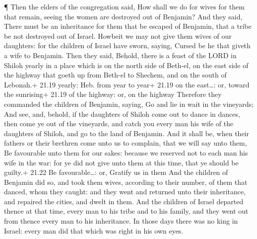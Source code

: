  ¶ Then the elders of the congregation said, How shall we
do for wives for them that remain, seeing the women are destroyed out of
Benjamin?  And they said, There must be an inheritance for
them that be escaped of Benjamin, that a tribe be not destroyed out of
Israel.  Howbeit we may not give them wives of our
daughters: for the children of Israel have sworn, saying, Cursed be he
that giveth a wife to Benjamin.  Then they said, Behold,
there is a feast of the LORD in Shiloh yearly in a place which is on the
north side of Beth-el, on the east side of the highway that goeth up
from Beth-el to Shechem, and on the south of Lebonah.+ 21.19 yearly:
Heb. from year to year+ 21.19 on the east\ldots: or, toward the
sunrising+ 21.19 of the highway: or, on the highway 
Therefore they commanded the children of Benjamin, saying, Go and lie in
wait in the vineyards;  And see, and, behold, if the
daughters of Shiloh come out to dance in dances, then come ye out of the
vineyards, and catch you every man his wife of the daughters of Shiloh,
and go to the land of Benjamin.  And it shall be, when
their fathers or their brethren come unto us to complain, that we will
say unto them, Be favourable unto them for our sakes: because we
reserved not to each man his wife in the war: for ye did not give unto
them at this time, that ye should be guilty.+ 21.22 Be favourable\ldots:
or, Gratify us in them  And the children of Benjamin did
so, and took them wives, according to their number, of them that danced,
whom they caught: and they went and returned unto their inheritance, and
repaired the cities, and dwelt in them.  And the children
of Israel departed thence at that time, every man to his tribe and to
his family, and they went out from thence every man to his inheritance.
 In those days there was no king in Israel: every man did
that which was right in his own eyes.
